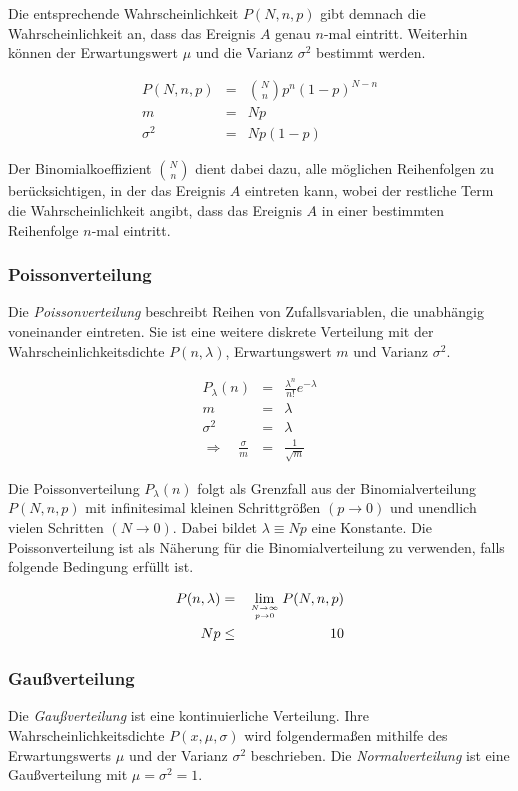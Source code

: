 \documentclass[12pt,a4paper]{scrartcl}
\numberwithin{equation}{section} %
\renewcommand{\[}{} %
\renewcommand{\]}{\noindent} %
\begin{document}
Die entsprechende  Wahrscheinlichkeit $P(N,n,p)$ gibt demnach die Wahrscheinlichkeit an, dass das Ereignis $A$ genau $n$-mal eintritt. Weiterhin können der Erwartungswert $\mu$ und die Varianz $\sigma^2$ bestimmt werden.

\begin{eqnarray}
	P(N,n,p) &=& \binom{N}{n} p^n (1-p)^{N-n} \\
	m &=& Np \\
	\sigma^2 &=& N p (1-p)
\end{eqnarray}

\noindent
Der Binomialkoeffizient $\binom{N}{n}$ dient dabei dazu, alle möglichen Reihenfolgen zu berücksichtigen, in der das Ereignis $A$ eintreten kann, wobei der restliche Term die Wahrscheinlichkeit angibt, dass das Ereignis $A$ in einer bestimmten Reihenfolge $n$-mal eintritt.

\subsubsection{Poissonverteilung}
\label{Poissonverteilung}
Die \emph{Poissonverteilung} beschreibt Reihen von Zufallsvariablen, die unabhängig voneinander eintreten. Sie ist eine weitere diskrete Verteilung mit der Wahrscheinlichkeitsdichte $P(n,\lambda)$, Erwartungswert $m$ und Varianz $\sigma^2$.

\begin{eqnarray}
	P_\lambda(n) &=& \frac{\lambda^n}{n!} e^{-\lambda}
	\label{eq:poisson} \\
	m &=& \lambda\\
	\sigma^2 &=& \lambda \\
	\Rightarrow\quad \frac{\sigma}{m} &=&\frac{1}{\sqrt{m}} \label{eq:Poisson STD/EW}
\end{eqnarray}

\noindent
Die Poissonverteilung $P_\lambda(n)$ folgt als Grenzfall aus der Binomialverteilung $P(N, n, p)$ mit infinitesimal kleinen Schrittgrößen $(p\rightarrow 0)$ und unendlich vielen Schritten $(N\rightarrow 0)$. Dabei bildet $\lambda\equiv Np$ eine Konstante. Die Poissonverteilung ist als Näherung für die Binomialverteilung zu verwenden, falls folgende Bedingung erfüllt ist.

\begin{eqnarray}
	P(n, \lambda)  &=& \lim_{N \rightarrow \infty \atop p\rightarrow 0} P(N, n, p) \\
	N p &\leq& 10
\end{eqnarray}

\subsubsection{Gaußverteilung}
\label{Gaußverteilung}
Die \emph{Gaußverteilung} ist eine kontinuierliche Verteilung. Ihre Wahrscheinlichkeitsdichte $P(x,\mu,\sigma)$ wird folgendermaßen mithilfe des Erwartungswerts $\mu$ und der Varianz $\sigma^2$ beschrieben. Die \emph{Normalverteilung}  ist eine Gaußverteilung mit $\mu=\sigma^2=1$.
\end{document}
